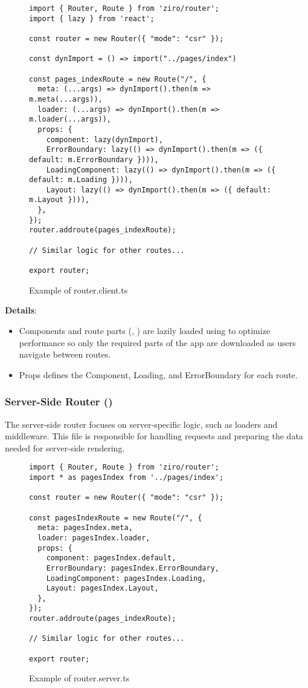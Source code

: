 \begin{figure}[H]
\begin{verbatim}
import { Router, Route } from 'ziro/router';
import { lazy } from 'react';

const router = new Router({ "mode": "csr" });

const dynImport = () => import("../pages/index")

const pages_indexRoute = new Route("/", {
  meta: (...args) => dynImport().then(m => m.meta(...args)),
  loader: (...args) => dynImport().then(m => m.loader(...args)),
  props: {
    component: lazy(dynImport),
    ErrorBoundary: lazy(() => dynImport().then(m => ({ default: m.ErrorBoundary }))),
    LoadingComponent: lazy(() => dynImport().then(m => ({ default: m.Loading }))),
    Layout: lazy(() => dynImport().then(m => ({ default: m.Layout }))),
  },
});
router.addroute(pages_indexRoute);

// Similar logic for other routes...

export router;
\end{verbatim}
\caption{Example of router.client.ts}
\end{figure}

\textbf{Details}:
\begin{itemize}
  \item Components and route parts (, ) are lazily loaded using  to optimize performance so only the required parts of the app are downloaded as users navigate between routes.
  \item Props defines the Component, Loading, and ErrorBoundary for each route.
\end{itemize}

\subsubsection{Server-Side Router ()}

The server-side router focuses on server-specific logic, such as loaders and middleware. This file is responsible for handling requests and preparing the data needed for server-side rendering.

\begin{figure}[H]
\begin{verbatim}
import { Router, Route } from 'ziro/router';
import * as pagesIndex from '../pages/index';

const router = new Router({ "mode": "csr" });

const pagesIndexRoute = new Route("/", {
  meta: pagesIndex.meta,
  loader: pagesIndex.loader,
  props: {
    component: pagesIndex.default,
    ErrorBoundary: pagesIndex.ErrorBoundary,
    LoadingComponent: pagesIndex.Loading,
    Layout: pagesIndex.Layout,
  },
});
router.addroute(pages_indexRoute);

// Similar logic for other routes...

export router;
\end{verbatim}
\caption{Example of router.server.ts}
\end{figure}

